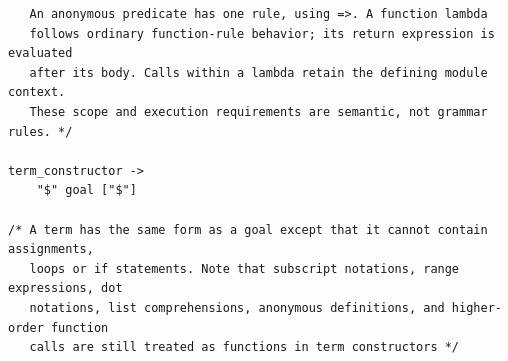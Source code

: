 \begin{scriptsize}
\begin{verbatim}
   An anonymous predicate has one rule, using =>. A function lambda
   follows ordinary function-rule behavior; its return expression is evaluated
   after its body. Calls within a lambda retain the defining module context.
   These scope and execution requirements are semantic, not grammar rules. */

term_constructor ->
    "$" goal ["$"]

/* A term has the same form as a goal except that it cannot contain assignments,
   loops or if statements. Note that subscript notations, range expressions, dot
   notations, list comprehensions, anonymous definitions, and higher-order function 
   calls are still treated as functions in term constructors */

\end{verbatim}
\end{scriptsize}
\ignore{

}
